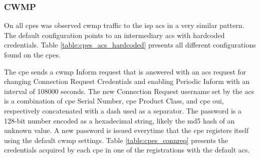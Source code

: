 \subsubsection{CWMP}

On all \glspl{cpe} was observed \gls{cwmp} traffic to the \gls{isp} \gls{acs} in a very similar pattern. The default configuration points to an intermediary \gls{acs} with hardcoded credentials. Table \ref{table:cpes_acs_hardcoded} presents all different configurations found on the \gls{cpe}s.

\begin{table}[h]
    \caption{Hardcoded \gls{acs} Credentials of the \gls{cpe}s}
    \label{table:cpes_acs_hardcoded}
\end{table}

The \gls{cpe} sends a \gls{cwmp} Inform request that is answered with an \gls{acs} request for changing Connection Request Credentials and enabling Periodic Inform with an interval of 108000 seconds. The new Connection Request username set by the \gls{acs} is a combination of \gls{cpe} Serial Number, \gls{cpe} Product Class, and \gls{cpe} \gls{oui}, respectively concatenated with a dash used as a separator. The password is a 128-bit number encoded as a hexadecimal string, likely the \gls{md5} hash of an unknown value. A new password is issued everytime that the \gls{cpe} registers itself using the default \gls{cwmp} settings. Table \ref{table:cpes_connreq} presents the credentials acquired by each \gls{cpe} in one of the registrations with the default \gls{acs}.

